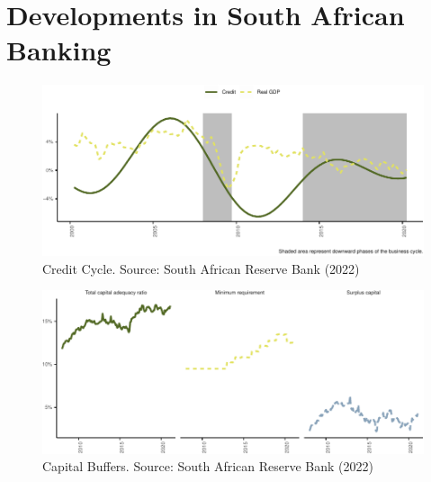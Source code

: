 \documentclass[
]{article}
\begin{document}
\citet{altunbas2004bank}

\citet{gambacorta2018bank}

\citet{berrospide2010effects}

\newpage

\hypertarget{developments-in-south-african-banking}{%
\section{Developments in South African Banking}\label{developments-in-south-african-banking}}

\begin{figure}[H]

\includegraphics{Bank_capital_and_bank_lending_files/figure-latex/unnamed-chunk-1-1} \hfill{}

\caption{Credit Cycle. Source: South African Reserve Bank (2022)}\label{fig:unnamed-chunk-1}
\end{figure}

\begin{figure}[H]

\includegraphics{Bank_capital_and_bank_lending_files/figure-latex/unnamed-chunk-2-1} \hfill{}

\caption{Capital Buffers. Source: South African Reserve Bank (2022)}\label{fig:unnamed-chunk-2}
\end{figure}
\end{document}
